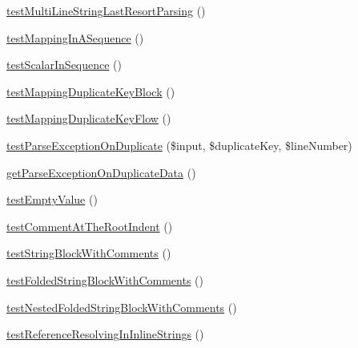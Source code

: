 \begin{DoxyCompactItemize}
\item 
\mbox{\hyperlink{class_symfony_1_1_component_1_1_yaml_1_1_tests_1_1_parser_test_affe6ed70efaa54da1937f6e41817d9d7}{test\+Multi\+Line\+String\+Last\+Resort\+Parsing}} ()
\item 
\mbox{\hyperlink{class_symfony_1_1_component_1_1_yaml_1_1_tests_1_1_parser_test_a9aa015561d9c9407cab43f6be94536e1}{test\+Mapping\+In\+A\+Sequence}} ()
\item 
\mbox{\hyperlink{class_symfony_1_1_component_1_1_yaml_1_1_tests_1_1_parser_test_a80633f6896a5e92dae76b16be88c97e7}{test\+Scalar\+In\+Sequence}} ()
\item 
\mbox{\hyperlink{class_symfony_1_1_component_1_1_yaml_1_1_tests_1_1_parser_test_a25c95f2d7584175a9efb960799383a56}{test\+Mapping\+Duplicate\+Key\+Block}} ()
\item 
\mbox{\hyperlink{class_symfony_1_1_component_1_1_yaml_1_1_tests_1_1_parser_test_aa71fb50154fd6d770e8322ca6ba49447}{test\+Mapping\+Duplicate\+Key\+Flow}} ()
\item 
\mbox{\hyperlink{class_symfony_1_1_component_1_1_yaml_1_1_tests_1_1_parser_test_a9e5ce43f84b9862cfec1e6a61184d88e}{test\+Parse\+Exception\+On\+Duplicate}} (\$input, \$duplicate\+Key, \$line\+Number)
\item 
\mbox{\hyperlink{class_symfony_1_1_component_1_1_yaml_1_1_tests_1_1_parser_test_a445e325fd3023d937c1e34b55bb797be}{get\+Parse\+Exception\+On\+Duplicate\+Data}} ()
\item 
\mbox{\hyperlink{class_symfony_1_1_component_1_1_yaml_1_1_tests_1_1_parser_test_af62a4728914f98cc9de68db8d2795941}{test\+Empty\+Value}} ()
\item 
\mbox{\hyperlink{class_symfony_1_1_component_1_1_yaml_1_1_tests_1_1_parser_test_a74026136dc076e27fa4494852ec4d049}{test\+Comment\+At\+The\+Root\+Indent}} ()
\item 
\mbox{\hyperlink{class_symfony_1_1_component_1_1_yaml_1_1_tests_1_1_parser_test_a1e91cbbf9133f7252fc02c306f5805c0}{test\+String\+Block\+With\+Comments}} ()
\item 
\mbox{\hyperlink{class_symfony_1_1_component_1_1_yaml_1_1_tests_1_1_parser_test_a173a2f7da9395355deec7c67de0bc6c1}{test\+Folded\+String\+Block\+With\+Comments}} ()
\item 
\mbox{\hyperlink{class_symfony_1_1_component_1_1_yaml_1_1_tests_1_1_parser_test_a8c093ab07081e9a41168bb80705721f9}{test\+Nested\+Folded\+String\+Block\+With\+Comments}} ()
\item 
\mbox{\hyperlink{class_symfony_1_1_component_1_1_yaml_1_1_tests_1_1_parser_test_a19d50c6e12b39d84a9df0fe8393b1864}{test\+Reference\+Resolving\+In\+Inline\+Strings}} ()

\end{DoxyCompactItemize}
